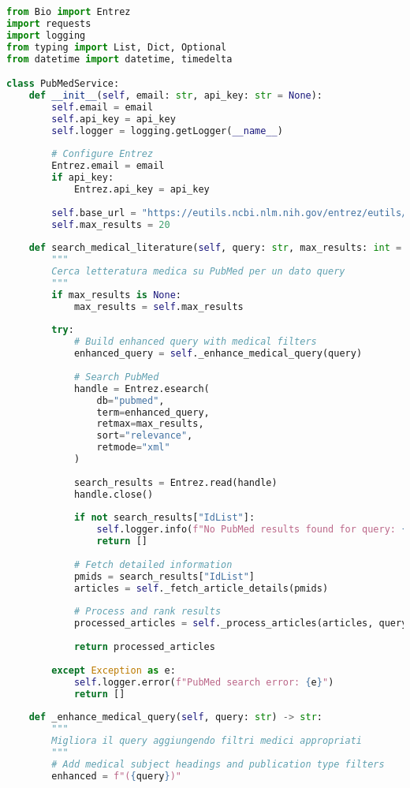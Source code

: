 \documentclass[12pt,a4paper]{report}
\begin{document}
\begin{lstlisting}[language=Python, caption=PubMed Service Implementation]
from Bio import Entrez
import requests
import logging
from typing import List, Dict, Optional
from datetime import datetime, timedelta

class PubMedService:
    def __init__(self, email: str, api_key: str = None):
        self.email = email
        self.api_key = api_key
        self.logger = logging.getLogger(__name__)
        
        # Configure Entrez
        Entrez.email = email
        if api_key:
            Entrez.api_key = api_key
        
        self.base_url = "https://eutils.ncbi.nlm.nih.gov/entrez/eutils/"
        self.max_results = 20
    
    def search_medical_literature(self, query: str, max_results: int = None) -> List[Dict]:
        """
        Cerca letteratura medica su PubMed per un dato query
        """
        if max_results is None:
            max_results = self.max_results
        
        try:
            # Build enhanced query with medical filters
            enhanced_query = self._enhance_medical_query(query)
            
            # Search PubMed
            handle = Entrez.esearch(
                db="pubmed",
                term=enhanced_query,
                retmax=max_results,
                sort="relevance",
                retmode="xml"
            )
            
            search_results = Entrez.read(handle)
            handle.close()
            
            if not search_results["IdList"]:
                self.logger.info(f"No PubMed results found for query: {query}")
                return []
            
            # Fetch detailed information
            pmids = search_results["IdList"]
            articles = self._fetch_article_details(pmids)
            
            # Process and rank results
            processed_articles = self._process_articles(articles, query)
            
            return processed_articles
            
        except Exception as e:
            self.logger.error(f"PubMed search error: {e}")
            return []
    
    def _enhance_medical_query(self, query: str) -> str:
        """
        Migliora il query aggiungendo filtri medici appropriati
        """
        # Add medical subject headings and publication type filters
        enhanced = f"({query})"
        

\end{lstlisting}
\end{document}
